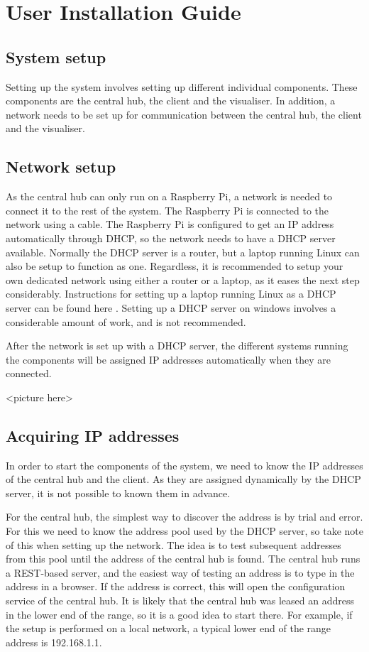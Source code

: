\documentclass[../document.tex]{subfiles}
\begin{document}
\section{User Installation Guide}

\subsection{System setup}
Setting up the system involves setting up different individual components. These components are the central hub, the client and the visualiser. In addition, a network needs to be set up for communication between the central hub, the client and the visualiser.

\subsection{Network setup}
As the central hub can only run on a Raspberry Pi, a network is needed to connect it to the rest of the system. The Raspberry Pi is connected to the network using a cable. The Raspberry Pi is configured to get an IP address automatically through DHCP, so the network needs to have a DHCP server available. Normally the DHCP server is a router, but a laptop running Linux can also be setup to function as one. Regardless, it is recommended to setup your own dedicated network using either a router or a laptop, as it eases the next step considerably. Instructions for setting up a laptop running Linux as a DHCP server can be found here .
Setting up a DHCP server on windows involves a considerable amount of work, and is not recommended.

After the network is set up with a DHCP server, the different systems running the components will be assigned IP addresses automatically when they are connected.

{\color{red} <picture here>}

\subsection{Acquiring IP addresses}
In order to start the components of the system, we need to know the IP addresses of the central hub and the client. As they are assigned dynamically by the DHCP server, it is not possible to known them in advance.

For the central hub, the simplest way to discover the address is by trial and error. For this we need to know the address pool used by the DHCP server, so take note of this when setting up the network. The idea is to test subsequent addresses from this pool until the address of the central hub is found. The central hub runs a REST-based server, and the easiest way of testing an address is to type in the address in a browser. If the address is correct, this will open the configuration service of the central hub. It is likely that the central hub was leased an address in the lower end of the range, so it is a good idea to start there. For example, if the setup is performed on a local network, a typical lower end of the range address is 192.168.1.1.
\end{document}
